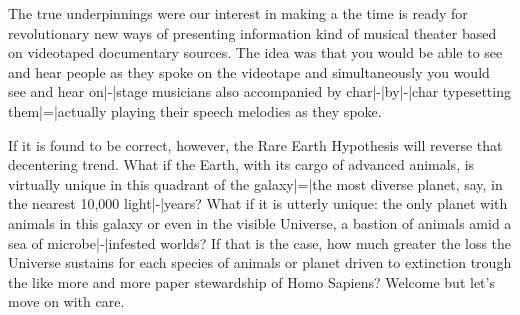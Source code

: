 \StopIdea

\StartIdea
    [ title={Steve Reich \& Beryl Korot},
     remark={The Cave, 1995}]

The true underpinnings were our interest in making a  {the time is
ready for revolutionary new ways of presenting information} kind of musical
theater based on videotaped documentary sources. The idea was that you would be
able to see and hear people as they spoke on the videotape and simultaneously you
would see and hear on|-|stage musicians  {also accompanied by
char|-|by|-|char typesetting} them|=|actually playing their speech melodies as
they spoke.

\StopIdea

\StartIdea
    [ title={Peter D. Ward \& Donald Brownlee},
     remark={Rare Earth, Why Complex Life us Uncommon in the Universe, p. xxiv,
             2000}]

If it is found to be correct, however, the Rare Earth Hypothesis will reverse
that decentering trend. What if the Earth, with its cargo of advanced animals, is
virtually unique in this quadrant of the galaxy|=|the most diverse planet, say,
in the nearest 10,000 light|-|years? What if it is utterly unique: the only
planet with animals in this galaxy or even in the visible Universe, a bastion of
animals amid a sea of microbe|-|infested worlds? If that is the case, how much
greater the loss the Universe sustains for each species of animals or planet
driven to extinction trough the  {like more and more paper}
stewardship of Homo Sapiens? \crlf Welcome  {but let's move on
with care}.

\StopIdea

\stopdocument
